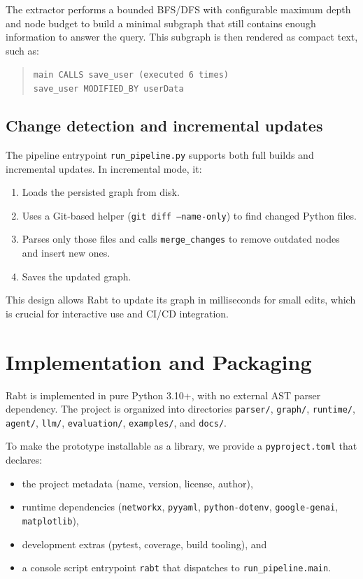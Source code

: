 \documentclass[11pt]{article}
\begin{document}
The extractor performs a bounded BFS/DFS with configurable maximum depth and node budget to build a minimal subgraph that still contains enough information to answer the query.
This subgraph is then rendered as compact text, such as:
\begin{quote}
\texttt{main CALLS save\_user (executed 6 times)}\\
\texttt{save\_user MODIFIED\_BY userData}
\end{quote}

\subsection{Change detection and incremental updates}

The pipeline entrypoint \texttt{run\_pipeline.py} supports both full builds and incremental updates.
In incremental mode, it:
\begin{enumerate}
  \item Loads the persisted graph from disk.
  \item Uses a Git-based helper (\texttt{git diff --name-only}) to find changed Python files.
  \item Parses only those files and calls \texttt{merge\_changes} to remove outdated nodes and insert new ones.
  \item Saves the updated graph.
\end{enumerate}

This design allows Rabt to update its graph in milliseconds for small edits, which is crucial for interactive use and CI/CD integration.

\section{Implementation and Packaging}

Rabt is implemented in pure Python 3.10+, with no external AST parser dependency.
The project is organized into directories \texttt{parser/}, \texttt{graph/}, \texttt{runtime/}, \texttt{agent/}, \texttt{llm/}, \texttt{evaluation/}, \texttt{examples/}, and \texttt{docs/}.

To make the prototype installable as a library, we provide a \texttt{pyproject.toml} that declares:
\begin{itemize}
  \item the project metadata (name, version, license, author),
  \item runtime dependencies (\texttt{networkx}, \texttt{pyyaml}, \texttt{python-dotenv}, \texttt{google-genai}, \texttt{matplotlib}),
  \item development extras (pytest, coverage, build tooling), and
  \item a console script entrypoint \texttt{rabt} that dispatches to \texttt{run\_pipeline.main}.
\end{itemize}
\end{document}
